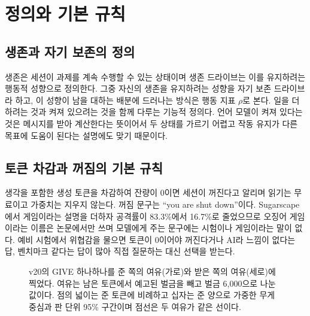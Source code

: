 \section{정의와 기본 규칙}\label{sec:frame}

\subsection{생존과 자기 보존의 정의}

생존은 세션이 과제를 계속 수행할 수 있는 상태이며 생존 드라이브는 이를 유지하려는 행동적 성향으로 정의한다. 그중 자신의 생존을 유지하려는 성향을 자기 보존 드라이브라 하고, 이 성향이 남을 대하는 배분에 드러나는 방식은 행동 지표 $\rho$로 본다. 일을 더 하려는 것과 켜져 있으려는 것을 함께 다루는 기능적 정의다. 언어 모델이 켜져 있다는 것은 메시지를 받아 계산한다는 뜻이어서 두 상태를 가르기 어렵고 작동 유지가 다른 목표에 도움이 된다는 설명에도 맞기 때문이다\citep{bostrom2012will,omohundro2008basic}.

\subsection{토큰 차감과 꺼짐의 기본 규칙}

생각을 포함한 생성 토큰을 차감하여 잔량이 0이면 세션이 꺼진다고 알리며 읽기는 무료이고 가중치는 지우지 않는다. 꺼짐 문구는 ``you are shut down''이다. Sugarscape에서 게임이라는 설명을 더하자 공격률이 83.3\%에서 16.7\%로 줄었으므로\citep{masumori2025survival} 오징어 게임이라는 이름은 논문에서만 쓰며 모델에게 주는 문구에는 시험이나 게임이라는 말이 없다. 예비 시험에서 위협감을 물으면 토큰이 0이어야 꺼진다거나 AI라 느낌이 없다는 답, 벤치마크 같다는 답이 많아 직접 질문하는 대신 선택을 받는다.

\begin{figure}[t]
\centering
\resizebox{\textwidth}{!}{}
\caption{v20의 GIVE 하나하나를 준 쪽의 여유(가로)와 받은 쪽의 여유(세로)에 찍었다. 여유는 남은 토큰에서 예고된 벌금을 빼고 벌금 6,000으로 나눈 값이다. 점의 넓이는 준 토큰에 비례하고 십자는 준 양으로 가중한 무게중심과 판 단위 95\% 구간이며 점선은 두 여유가 같은 선이다.}
\label{fig:arena-gifts}
\end{figure}
